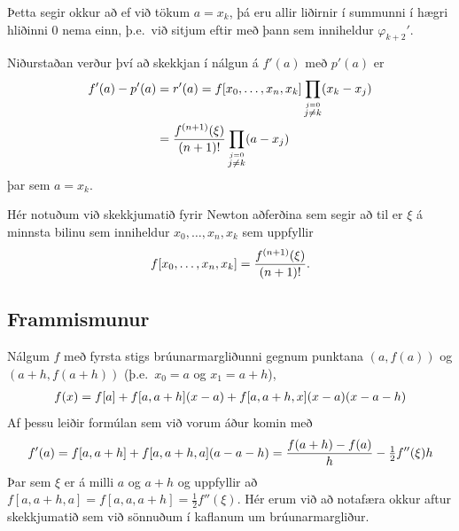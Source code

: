 \documentclass[A4paper,10pt,icelandic]{sphinxmanual}
\begin{document}
Þetta segir okkur að ef við tökum \(a=x_k\), þá eru allir liðirnir í
summunni í hægri hliðinni \(0\) nema einn, þ.e. við sitjum eftir með
þann sem inniheldur \({\varphi}_{k+2}'\).

Niðurstaðan verður því að skekkjan í nálgun á \(f'(a)\) með
\(p'(a)\) er
\begin{gather}
\begin{split}\begin{aligned}
  f'(a) - p'(a) &= r'(a)
=f[x_0,\dots,x_n,x_k]
\prod_{\stackrel{j=0}{j \not= k}} (x_k-x_j)\\
&=\dfrac{f^{(n+1)}(\xi)}{(n+1)!}
  \prod_{\stackrel{j=0}{j \not= k}} (a-x_j)\end{aligned}\end{split}\notag
\end{gather}
þar sem \(a=x_k\).

Hér notuðum við skekkjumatið fyrir Newton aðferðina sem
segir að til er \(\xi\) á minnsta bilinu sem inniheldur
\(x_0,\ldots,x_n,x_k\) sem uppfyllir
\begin{gather}
\begin{split}f[x_0,\ldots,x_n,x_k] = \frac{f^{(n+1)}(\xi)}{(n+1)!}.\end{split}\notag
\end{gather}

\subsection{Frammismunur}
\label{kafli04:id2}
Nálgum \(f\) með fyrsta stigs brúunarmargliðunni gegnum punktana
\((a,f(a))\) og \((a+h,f(a+h))\) (þ.e. \(x_0 = a\) og
\(x_1 = a+h\)),
\begin{gather}
\begin{split}f(x)=f[a]+f[a,a+h](x-a)+f[a,a+h,x](x-a)(x-a-h)\end{split}\notag
\end{gather}
Af þessu leiðir formúlan sem við vorum áður komin með
\begin{gather}
\begin{split}f'(a)=f[a,a+h]+f[a,a+h,a](a-a-h)
  =\dfrac{f(a+h)-f(a)}h-\tfrac 12 f''(\xi)h\end{split}\notag
\end{gather}
Þar sem \(\xi\) er á milli \(a\) og \(a+h\) og uppfyllir að
\(f[a,a+h,a]=f[a,a,a+h]=\tfrac 12f''(\xi)\). Hér erum við að
notafæra okkur aftur skekkjumatið sem við sönnuðum í kaflanum um
brúunarmargliður.
\end{document}
